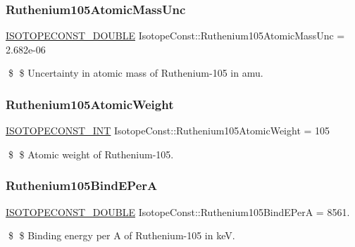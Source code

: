 \subsubsection{\texorpdfstring{Ruthenium105\+Atomic\+Mass\+Unc}{Ruthenium105AtomicMassUnc}}
{\footnotesize\ttfamily \mbox{\hyperlink{group___isotope_const-_macros_ga8f45a7272ce02c0b4c65c44636ed719a}{I\+S\+O\+T\+O\+P\+E\+C\+O\+N\+S\+T\+\_\+\+D\+O\+U\+B\+LE}} Isotope\+Const\+::\+Ruthenium105\+Atomic\+Mass\+Unc = 2.\+682e-\/06}

\$ \$ Uncertainty in atomic mass of Ruthenium-\/105 in amu. \mbox{\label{group___isotope_const-_ruthenium-_ru105_ga91b5a8f57fa37818c723c2a01d0c3a9f}} 
\subsubsection{\texorpdfstring{Ruthenium105\+Atomic\+Weight}{Ruthenium105AtomicWeight}}
{\footnotesize\ttfamily \mbox{\hyperlink{group___isotope_const-_macros_ga5f18360b3e99483a35c32d789e62621c}{I\+S\+O\+T\+O\+P\+E\+C\+O\+N\+S\+T\+\_\+\+I\+NT}} Isotope\+Const\+::\+Ruthenium105\+Atomic\+Weight = 105}

\$ \$ Atomic weight of Ruthenium-\/105. \mbox{\label{group___isotope_const-_ruthenium-_ru105_ga7c9a33eeb07916f8192c58c7c8915e53}} 
\subsubsection{\texorpdfstring{Ruthenium105\+Bind\+E\+PerA}{Ruthenium105BindEPerA}}
{\footnotesize\ttfamily \mbox{\hyperlink{group___isotope_const-_macros_ga8f45a7272ce02c0b4c65c44636ed719a}{I\+S\+O\+T\+O\+P\+E\+C\+O\+N\+S\+T\+\_\+\+D\+O\+U\+B\+LE}} Isotope\+Const\+::\+Ruthenium105\+Bind\+E\+PerA = 8561.}

\$ \$ Binding energy per A of Ruthenium-\/105 in keV. \mbox{\label{group___isotope_const-_ruthenium-_ru105_gabdf76bd548b295bba159d7b2c60d3c12}} 
